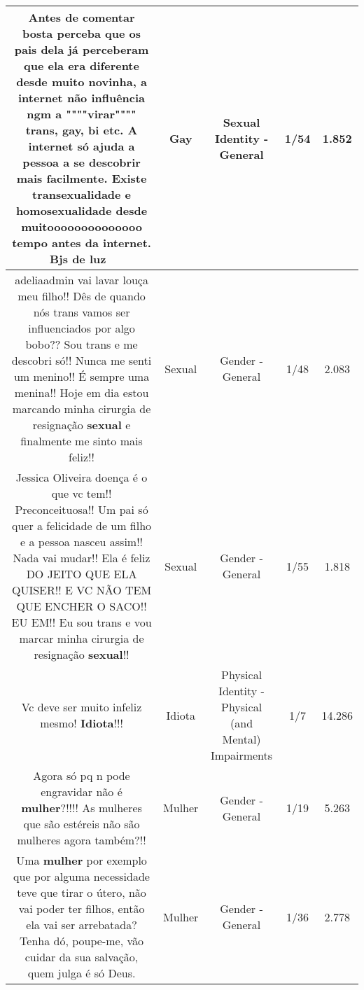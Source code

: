 \documentclass[11pt]{article}
\newlength\mylength
\begin{document}
\begin{center}
\begin{longtable}{|C{.65\mylength}|C{.30\mylength}|C{.12\mylength}|C{.12\mylength}|C{.12\mylength}|}
  \small Antes de comentar bosta perceba que os pais dela já perceberam que ela era diferente desde muito novinha, a internet não influência ngm a """"virar"""" trans, \textbf{gay}, bi etc. A internet só ajuda a pessoa a se descobrir mais facilmente. Existe transexualidade e homosexualidade desde muitoooooooooooooo tempo antes da internet. Bjs de luz 🖕\normalsize   & Gay & Sexual Identity - General & 1/54 & 1.852 \\  \hline
  \small adeliaadmin vai lavar louça meu filho!! Dês de quando nós trans vamos ser influenciados por algo bobo?? Sou trans e me descobri só!! Nunca me senti um menino!! É sempre uma menina!! Hoje em dia estou marcando minha cirurgia de resignação \textbf{sexual} e finalmente me sinto mais feliz!!\normalsize   & Sexual & Gender - General & 1/48 & 2.083 \\  \hline
  \small Jessica Oliveira doença é o que vc tem!! Preconceituosa!! Um pai só quer a felicidade de um filho e a pessoa nasceu assim!! Nada vai mudar!! Ela é feliz DO JEITO QUE ELA QUISER!! E VC NÃO TEM QUE ENCHER O SACO!! EU EM!! Eu sou trans e vou marcar minha cirurgia de resignação \textbf{sexual}!!\normalsize   & Sexual & Gender - General & 1/55 & 1.818 \\  \hline
  \small Vc deve ser muito infeliz mesmo! \textbf{Idiota}!!!\normalsize   & Idiota & Physical Identity - Physical (and Mental) Impairments & 1/7 & 14.286 \\  \hline
  \small Agora só pq n pode engravidar não é \textbf{mulher}?!!!! As mulheres que são estéreis não são mulheres agora também?!!\normalsize   & Mulher & Gender - General & 1/19 & 5.263 \\  \hline
  \small Uma \textbf{mulher} por exemplo que por alguma necessidade teve que tirar o útero, não vai poder ter filhos, então ela vai ser arrebatada? Tenha dó, poupe-me, vão cuidar da sua salvação, quem julga é só Deus.\normalsize   & Mulher & Gender - General & 1/36 & 2.778 \\  \hline

\end{longtable}
\end{center}
\end{document}
